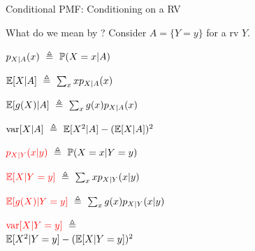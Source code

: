 \documentclass[fleqn,aspectratio=169]{beamer}
\begin{document}
\begin{frame}{Conditional PMF: Conditioning on a RV }

What do we mean by ? Consider $A = \{Y = y\}$ for a rv $Y.$

\medskip

{
\plitemsep 0.2in
\bci 

\item<2-> $p_{X|A}(x) \ \triangleq \ \mathbb{P}( X=x | A )$ 

\item<3-> $\mathbb{E}[ X | A ] \ \triangleq \ \sum_x x p_{X|A}(x)$

\item<4-> $\mathbb{E}[ g(X) | A ] \ \triangleq \ \sum_x g(x) p_{X|A}(x)$

\item<5-> $\text{var}[ X | A ] \ \triangleq \ \mathbb{E}[ X^2 |A  ] - (\mathbb{E}[ X|A ])^2$
\eci 
}
{
\plitemsep 0.2in
\bci 

\item<2-> ${\color{red} p_{X|Y}(x|y)} \ \triangleq \ \mathbb{P}( X=x |{Y = y } )$ 

\item<3-> ${\color{red} \mathbb{E}[ X | Y=y ]} \ \triangleq \ \sum_x x p_{X|Y}(x|y)$

\item<4-> $\redf{\expect{g(X) | Y=y}} \ \eqdef \ \sum_x g(x) \pxcy$

\item<5-> $\redf{\var{X | Y=y}} \ \eqdef$ \\ $\mathbb{E}[ X^2 |Y=y  ] - (\mathbb{E}[ X|Y=y ])^2$
\eci 

}

\end{frame}
\end{document}
